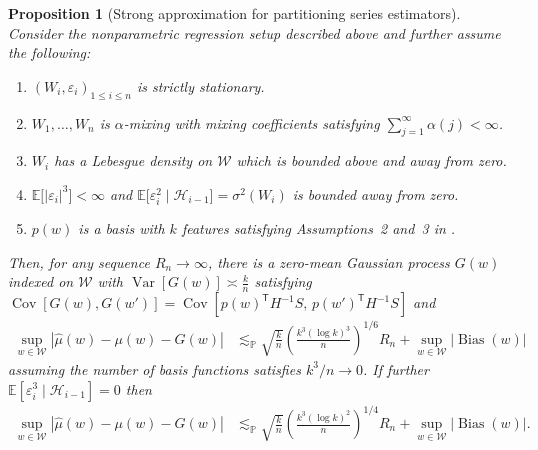 \documentclass[11pt,lof]{puthesis}
\renewcommand{\P}{\ensuremath{\mathbb{P}}}
\newcommand{\E}{\ensuremath{\mathbb{E}}}
\newcommand{\cH}{\ensuremath{\mathcal{H}}}
\newcommand{\cW}{\ensuremath{\mathcal{W}}}
\newcommand{\T}{\ensuremath{\mathsf{T}}}
\DeclareMathOperator{\Var}{Var}
\DeclareMathOperator{\Cov}{Cov}
\DeclareMathOperator{\Bias}{Bias}
\theoremstyle{break}
\newtheorem{proposition}{Proposition}[section]
\theoremstyle{proof}
\begin{document}
\begin{proposition}[Strong approximation for partitioning series estimators]%
  \label{pro:yurinskii_series}
  Consider the nonparametric regression setup described above
  and further assume the following:
  \begin{enumerate}[label=(\roman*)]

    \item
      $(W_i, \varepsilon_i)_{1 \leq i \leq n}$
      is strictly stationary.

    \item
      $W_1, \ldots, W_n$ is $\alpha$-mixing with mixing coefficients
      satisfying $\sum_{j=1}^\infty \alpha(j) < \infty$.

    \item
      $W_i$ has a Lebesgue density on $\cW$
      which is bounded above and away from zero.

    \item
      $\E\big[|\varepsilon_i|^3 \big] < \infty$
      and $\E\big[\varepsilon_i^2 \mid \cH_{i-1}\big]=\sigma^2(W_i)$ is bounded
      away from zero.

    \item
      $p(w)$ is a basis with $k$ features satisfying
      Assumptions~2 and~3 in \citet{cattaneo2020large}.

  \end{enumerate}
  Then, for any sequence $R_n \to \infty$,
  there is a zero-mean Gaussian process
  $G(w)$ indexed on $\cW$
  with $\Var[G(w)] \asymp\frac{k}{n}$
  satisfying $\Cov[G(w), G(w')] = \Cov[p(w)^\T H^{-1} S,\, p(w')^\T H^{-1} S]$
  and
  \begin{align*}
    \sup_{w \in \cW}
    \left| \hat\mu(w) - \mu(w) - G(w) \right|
    &\lesssim_\P
    \sqrt{\frac{k}{n}}
    \left( \frac{k^3 (\log k)^3}{n} \right)^{1/6} R_n
    + \sup_{w \in \cW} |\Bias(w)|
  \end{align*}
  assuming the number of basis functions satisfies $k^3 / n \to 0$.
  If further $\E \left[ \varepsilon_i^3 \mid \cH_{i-1} \right] = 0$ then
  \begin{align*}
    \sup_{w \in \cW}
    \left| \hat\mu(w) - \mu(w) - G(w) \right|
    &\lesssim_\P
    \sqrt{\frac{k}{n}}
    \left( \frac{k^3 (\log k)^2}{n} \right)^{1/4} R_n
    + \sup_{w \in \cW} |\Bias(w)|.
  \end{align*}
\end{proposition}
\end{document}
